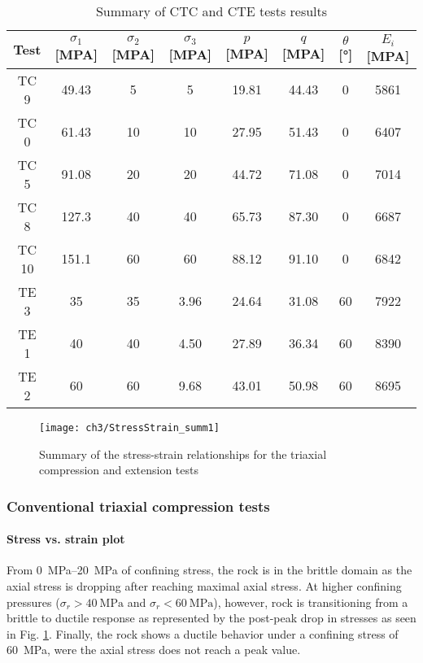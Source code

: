 \begin{table}
    \centering
    \caption{Summary of CTC and CTE tests results}
    \begin{tabular}{cccccccc}
        \hline 
        Test & $\sigma_1$ [\si{MPA}] & $\sigma_2$ [\si{MPA}] &$\sigma_3$ [\si{MPA}] & $p$ [\si{MPA}] & $q$ [\si{MPA}] & $\theta$ [\si{\degree}] & $E_i$ [\si{MPA}] \\
        \hline
        \hline
        TC 9  & 49.43 & 5  & 5    & 19.81 & 44.43 & 0  & 5861  \\ 
        TC 0  & 61.43 & 10 & 10   & 27.95 & 51.43 & 0  & 6407  \\ 
        TC 5  & 91.08 & 20 & 20   & 44.72 & 71.08 & 0  & 7014  \\ 
        TC 8  & 127.3 & 40 & 40   & 65.73 & 87.30 & 0  & 6687  \\ 
        TC 10 & 151.1 & 60 & 60   & 88.12 & 91.10 & 0  & 6842  \\ 
        \hline
        \hline
        TE 3  & 35    & 35 & 3.96 & 24.64 & 31.08 & 60 & 7922  \\ 
        TE 1  & 40    & 40 & 4.50 & 27.89 & 36.34 & 60 & 8390  \\ 
        TE 2  & 60    & 60 & 9.68 & 43.01 & 50.98 & 60 & 8695  \\
        \hline
    \end{tabular}
    \label{tb3:CTC-CTE-results}
\end{table}

\begin{figure}[p]
    \centering
    \texttt{[image: ch3/StressStrain\_summ1]}
    \caption{Summary of the stress-strain relationships for the triaxial compression and extension tests}
    \label{fig3:8}
\end{figure} 

\subsubsection{Conventional triaxial compression tests}

\paragraph{Stress vs. strain plot}
From \SIrange{0}{20}{MPa} of confining stress, the rock is in the brittle domain as the axial stress is dropping after reaching maximal axial stress. At higher confining pressures ($\sigma_r > \SI{40}{\mega\pascal}$ and $\sigma_r < \SI{60}{\mega\pascal}$), however, rock is transitioning from a brittle to ductile response as represented by the post-peak drop in stresses as seen in Fig. \ref{fig3:8}. Finally, the rock shows a ductile behavior under a confining stress of \SI{60}{MPa}, were the axial stress does not reach a peak value.

